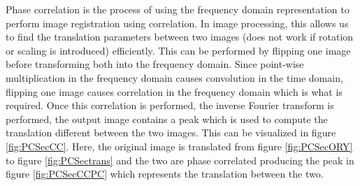 Phase correlation is the process of using the frequency domain representation to perform image registration using correlation. In image processing, this allows us to find the translation parameters between two images (does not work if rotation or scaling is introduced) efficiently. This can be performed by flipping one image before transforming both into the frequency domain. Since point-wise multiplication in the frequency domain causes convolution in the time domain, flipping one image causes correlation in the frequency domain which is what is required. Once this correlation is performed, the inverse Fourier transform is performed, the output image contains a peak which is used to compute the translation different between the two images. This can be visualized in figure \ref{fig:PCSecCC}. Here, the original image is translated from figure \ref{fig:PCSecORY} to figure \ref{fig:PCSectrans} and the two are phase correlated producing the peak in figure \ref{fig:PCSecCCPC} which represents the translation between the two. \\


